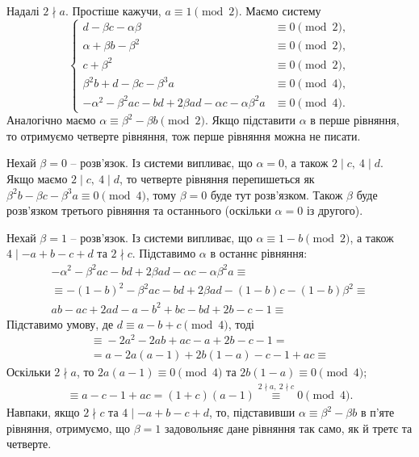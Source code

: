 \documentclass{thesis}
\begin{document}
Надалі $2 \nmid a$. Простіше кажучи, $a \equiv 1 \pmod 2$. Маємо систему
\begin{equation*}
\begin{cases}
d - \beta c - \alpha \beta & \equiv 0 \pmod 2, \\
\alpha + \beta b - \beta^2 & \equiv 0 \pmod 2, \\
c +\beta^2 & \equiv 0 \pmod 2, \\
\beta^2 b + d - \beta c - \beta^3 a & \equiv 0 \pmod {4}, \\
-\alpha^2 - \beta^2 ac - bd + 2 \beta a d - \alpha c - \alpha \beta^2 a & \equiv 0 \pmod {4}.
\end{cases}
\end{equation*}
Аналогічно маємо $\alpha \equiv \beta^2 - \beta b \pmod 2$. Якщо підставити $\alpha$ в перше рівняння, то отримуємо четверте рівняння, тож перше рівняння можна не писати.

Нехай $\beta = 0$ -- розв'язок. Із системи випливає, що $\alpha = 0$, а також $2 \mid c,\ 4 \mid d$. Якщо маємо $2 \mid c,\ 4 \mid d$, то четверте рівняння перепишеться як $\beta^2 b - \beta c - \beta^3 a \equiv 0 \pmod 4$, тому $\beta = 0$ буде тут розв'язком. Також $\beta$ буде розв'язком третього рівняння та останнього (оскільки $\alpha = 0$ із другого).

Нехай $\beta = 1$ -- розв'язок. Із системи випливає, що $\alpha \equiv 1-b \pmod 2$, а також $4 \mid -a+b-c+d$ та $2 \nmid c$. Підставимо $\alpha$ в останнє рівняння:
\begin{align*}
-\alpha^2 - \beta^2 ac - bd + 2\beta a d - \alpha c - \alpha \beta^2 a \equiv \\
\equiv -(1-b)^2 - \beta^2 ac - bd + 2 \beta ad - (1-b) c - (1-b) \beta^2 \equiv \\
ab - ac + 2ad - a - b^2 + bc - bd + 2b - c - 1 \boxed{\equiv}
\end{align*}
Підставимо умову, де $d \equiv a-b+c \pmod 4$, тоді
\begin{align*}
\boxed{\equiv} -2a^2 - 2ab + ac - a + 2b - c -1 = \\
= a - 2a(a-1) + 2b(1-a) - c - 1 + ac \boxed{\equiv}
\end{align*} 
Оскільки $2 \nmid a$, то $2a (a-1) \equiv 0 \pmod 4$ та $2b(1-a) \equiv 0 \pmod 4$;
\begin{align*}
\boxed{\equiv} a - c - 1 + ac = (1+c)(a-1) \overset{2\nmid a,\ 2 \nmid c}{\equiv} 0 \pmod 4.
\end{align*} 
Навпаки, якщо $2 \nmid c$ та $4 \mid -a+b-c+d$, то, підставивши $\alpha \equiv \beta^2 - \beta b$ в п'яте рівняння, отримуємо, що $\beta = 1$ задовольняє дане рівняння так само, як й третє та четверте.
\end{document}
